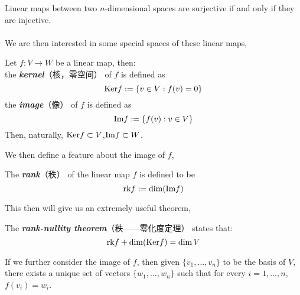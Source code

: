 Linear maps between two $n$-dimensional spaces are surjective if and only if they are injective. \\
\\
We are then interested in some special spaces of these linear maps, 
\begin{definition}
    Let $f: V \to W$ be a linear map, then: \\
    the \textbf{\textit{kernel}}（核，零空间） of $f$ is defined as
    $$\text{Ker} f := \{v \in V: f(v) = 0\}$$
    the \textbf{\textit{image}}（像） of $f$ is defined as
    $$\text{Im} f := \{f(v): v \in V\}$$
    Then, naturally, $\text{Ker} f \subset V$,$\text{Im} f \subset W$.
\end{definition}
We then define a feature about the image of $f$,
\begin{definition}
    The \textbf{\textit{rank}}（秩） of the linear map $f$ is defined to be
    $$\text{rk} f := \dim (\text{Im} f)$$
\end{definition}
This then will give us an extremely useful theorem,
\begin{theorem}
    The \textbf{\textit{rank-nullity theorem}}（秩——零化度定理） states that:
    $$\text{rk} f + \dim (\text{Ker} f) = \dim V$$
\end{theorem}
If we further consider the image of $f$, then given $\{v_1,\dots,v_n\}$ to be the basis of $V$, there exists a unique set of vectors $\{w_1, \dots, w_n\}$ such that for every $i=1,\dots, n$, $f(v_i)=w_i$.

